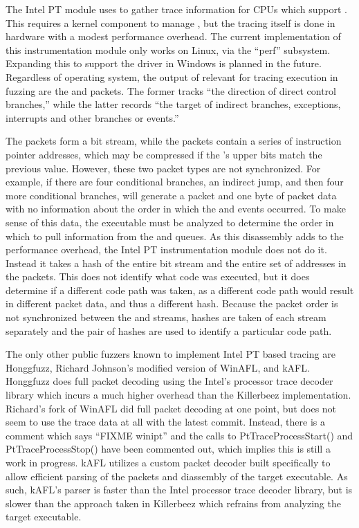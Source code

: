 The Intel PT module uses \IPT{} to gather trace information for CPUs which
support \IPT{}. This requires a kernel component to manage \IPT{}, but
the tracing itself is done in hardware with a modest performance overhead. The
current implementation of this instrumentation module only works on Linux, via
the ``perf'' subsystem. Expanding this to support the \IPT{} driver in Windows
is planned in the future. Regardless of operating system,
the output of \IPT{} relevant for tracing execution in fuzzing are the \TNT{} and
\TIP{} packets.  The former tracks ``the direction of direct control branches,''
while the latter records ``the target \IP{} of indirect branches, exceptions,
interrupts and other branches or events.''\cite{intelptmanual}

The \TNT{} packets form a bit stream, while the \TIP{} packets contain a series of
instruction pointer addresses, which may be compressed if the \IP{}'s upper bits match
the previous \IP{} value. However, these two packet types are not synchronized. For example, if there are four
conditional branches, an indirect jump, and then four more conditional branches, \IPT{} will generate
a \TIP{} packet and one byte of \TNT{} packet data with no
information about the order in which the \TIP{} and \TNT{} events occurred.  To make sense of
this data, the executable must be analyzed to determine the order in which to
pull information from the \TNT{} and \TIP{} queues. As this disassembly adds to the performance
overhead, the Intel PT instrumentation module does not do it. Instead it
takes a hash of the entire \TNT{} bit stream and the entire set of \IP{} addresses in the \TIP{} packets.
This does not identify what code was executed, but it does determine if a
different code path was taken, as a different code path would result in
different packet data, and thus a different hash. Because the packet order is
not synchronized between the \TNT{} and \TIP{} streams, hashes are taken of each
stream separately and the pair of hashes are used to identify a particular code path.

The only other public fuzzers known to implement Intel PT based tracing are
Honggfuzz\cite{honggfuzz}, Richard Johnson's modified version of
WinAFL\cite{winaflintelpt}, and kAFL\cite{kafl}. Honggfuzz does full packet decoding using the
Intel's processor trace decoder library\cite{libipt} which incurs a much
higher overhead than the Killerbeez implementation.  Richard's fork of WinAFL
did full packet decoding at one point, but does not seem to use the trace data
at all with the latest commit.\cite{winaflcommit} Instead, there is a comment which says
``FIXME winipt'' and the calls to PtTraceProcessStart() and
PtTraceProcessStop() have been commented out, which implies this is still a
work in progress. kAFL utilizes a custom packet decoder built specifically to
allow efficient parsing of the \IPT{} packets and diassembly of the target
executable.  As such, kAFL's \IPT{} parser is faster than the Intel processor trace
decoder library, but is slower than the approach taken in Killerbeez which
refrains from analyzing the target executable.

